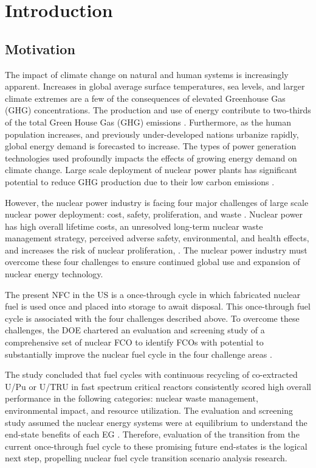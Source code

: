 \chapter[Introduction]{Introduction}
\label{chap:1}

\section{Motivation}
The impact of climate change on natural and human systems 
is increasingly apparent.
Increases in global average 
surface temperatures, sea levels, and larger climate extremes
are a few of the consequences of elevated Greenhouse Gas (GHG) 
concentrations.
The production and use of energy contribute to 
two-thirds of the total Green House Gas (GHG) 
emissions \cite{noauthor_climate_2018}.
Furthermore, as the human population increases, and previously 
under-developed nations urbanize rapidly, 
global energy demand is forecasted to increase.  
The types of power generation technologies used 
profoundly impacts the effects of growing energy demand 
on climate change.  
Large scale deployment of nuclear power plants has significant 
potential to reduce GHG production due to their low 
carbon emissions \cite{noauthor_climate_2018}.  

However, the nuclear power industry is facing four major challenges 
of large scale nuclear power deployment: 
cost, safety, proliferation, and waste 
\cite{massachusetts_institute_of_technology_future_2003}. 
Nuclear power has high overall lifetime costs, an unresolved 
long-term nuclear waste management strategy, perceived adverse safety, 
environmental, and health effects, and increases the risk of nuclear proliferation,
\cite{massachusetts_institute_of_technology_future_2003}. 
The nuclear power industry must overcome these four challenges 
to ensure continued global use and expansion 
of nuclear energy technology. 

The present \gls{NFC} in the \gls{US} is a once-through cycle 
in which fabricated nuclear fuel is used once and placed into 
storage to await disposal. 
This once-through fuel cycle is associated with the four
challenges described above.
To overcome these challenges, the \gls{DOE} chartered an evaluation 
and screening study of a comprehensive set of nuclear \gls{FCO} 
to identify \glspl{FCO} with potential to substantially 
improve the nuclear fuel cycle in the four challenge areas
\cite{wigeland_nuclear_2014}. 

The study concluded that fuel cycles with continuous recycling
of co-extracted U/Pu or U/TRU in fast spectrum critical reactors
consistently scored high overall performance in the following 
categories: nuclear waste management, environmental impact, 
and resource utilization. 
The evaluation and screening study assumed
the nuclear energy systems were at equilibrium to understand 
the end-state benefits of each \gls{EG} \cite{feng_standardized_2016}. 
Therefore, evaluation of the transition from the current 
once-through fuel cycle to these promising 
future end-states \cite{feng_standardized_2016} 
is the logical next step, propelling 
nuclear fuel cycle transition 
scenario analysis research. 

